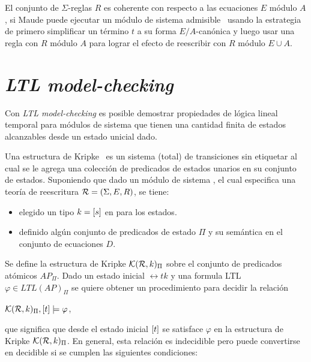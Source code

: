  El conjunto de $\Sigma$-reglas $R$ es coherente con respecto a las
 ecuaciones $E$ m\'odulo $A$, si Maude puede ejecutar un m\'odulo de sistema
 admisible~\cite{maude-book} usando la estrategia de primero simplificar
 un t\'ermino $t$ a su forma $E/A$-can\'onica y luego usar una regla con $R$
 m\'odulo $A$ para lograr el efecto de reescribir con $R$ m\'odulo $E \cup A$.

\section{{\em LTL model-checking}}
\label{ltl.prelim}

Con {\em LTL model-checking} es posible demostrar propiedades de l\'ogica
lineal temporal para m\'odulos de sistema que tienen una cantidad finita de
estados alcanzables desde un estado unicial dado.

Una estructura de Kripke~\cite{clarke-book} es un sistema (total) de
transiciones sin etiquetar al cual se le agrega una colecci\'on de
predicados de estados unarios en su conjunto de estados.
Suponiendo que dado un m\'odulo de sistema , el cual especifica una
teor\'ia de reescritura $\mathcal{R} = (\Sigma,E,R)$, se tiene:

\begin{itemize}
   \item elegido un tipo $k = [s]$ en  para los estados.
   
   \item definido alg\'un conjunto de predicados de estado $\Pi$ y su
	sem\'antica en el conjunto de ecuaciones $D$.
\end{itemize}

Se define la estructura de Kripke $\mathcal{K}(\mathcal{R},k)_{\Pi}$ sobre el conjunto
de predicados at\'omicos $AP_{\Pi}$. Dado un estado inicial $\rel{t}{k}$ y
una formula LTL $\varphi \in LTL(AP)_\Pi$ se quiere obtener un
procedimiento para decidir la relaci\'on

$\mathcal{K}(\mathcal{R},k)_{\Pi}, [t] \models \varphi$,

\noindent que significa que desde el estado inicial $[t]$ se
satisface $\varphi$ en la estructura de Kripke $\mathcal{K}(\mathcal{R},k)_{\Pi}$.
En general, esta relaci\'on es indecidible pero puede convertirse en
decidible si se cumplen las siguientes condiciones:

